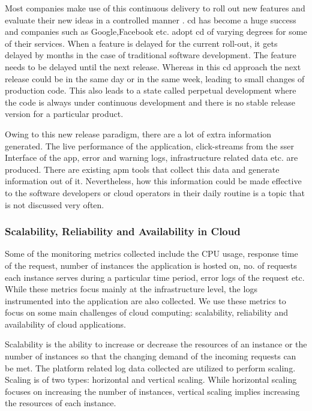 \documentclass[article,type=msc,colorback,12pt,accentcolor=tud8b,table]{tudthesis}
\begin{document}
		Most companies make use of this continuous delivery to roll out new features and evaluate their new ideas in a controlled manner \cite{kohavi2007practical}. \gls{cd} has become a huge success and companies such as Google,Facebook etc. adopt \gls{cd} of varying degrees for some of their services. When a feature is delayed for the current roll-out, it gets delayed by months in the case of traditional software development. The feature needs to be delayed until the next release. Whereas in this \gls{cd} approach the next release could be in the same day or in the same week, leading to small changes of production code. This also leads to a state called perpetual development where the code is always under continuous development and there is no stable release version for a particular product.  	\par Owing to this new release paradigm, there are a lot of extra information generated. The live performance of the application, click-streams from the sser Interface of the app, error and warning logs, infrastructure related data etc. are produced. There are existing \gls{apm} tools that collect this data and generate information out of it. Nevertheless, how this information could be made effective to the software developers or cloud operators in their daily routine is a topic that is not discussed very often. 
		
		\subsubsection{Scalability, Reliability  and Availability in Cloud}
		
		Some of the monitoring metrics collected include the CPU usage, response time of the request, number of instances the application is hosted on, no. of requests each instance serves during a particular time period, error logs of the request etc. While these metrics focus mainly at the infrastructure level, the logs instrumented into the application are also collected. We use these metrics to focus on some main challenges of cloud computing: scalability, reliability and availability of cloud applications.
		
		\par Scalability is the ability to increase or decrease the resources of an instance or the number of instances so that the changing demand of the incoming requests can be met. The platform related log data collected are utilized to perform scaling. Scaling is of two types: horizontal and vertical scaling. While horizontal scaling focuses on increasing the number of instances, vertical scaling implies increasing the resources of each instance.
		
\end{document}
